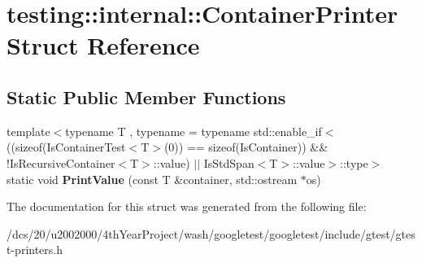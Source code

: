 \hypertarget{structtesting_1_1internal_1_1ContainerPrinter}{}\section{testing\+:\+:internal\+:\+:Container\+Printer Struct Reference}
\label{structtesting_1_1internal_1_1ContainerPrinter}
\subsection*{Static Public Member Functions}
\begin{DoxyCompactItemize}
\item 
\mbox{\label{structtesting_1_1internal_1_1ContainerPrinter_a1eabfa51051d78bf129afbd3ad99a2b0}} 
{\footnotesize template$<$typename T , typename  = typename std\+::enable\+\_\+if$<$                ((sizeof(\+Is\+Container\+Test$<$\+T$>$(0)) == sizeof(\+Is\+Container)) \&\&                 !\+Is\+Recursive\+Container$<$\+T$>$\+::value) $\vert$$\vert$                Is\+Std\+Span$<$\+T$>$\+::value$>$\+::type$>$ }\\static void {\bfseries Print\+Value} (const T \&container, std\+::ostream $\ast$os)
\end{DoxyCompactItemize}


The documentation for this struct was generated from the following file\+:\begin{DoxyCompactItemize}
\item 
/dcs/20/u2002000/4th\+Year\+Project/wash/googletest/googletest/include/gtest/gtest-\/printers.\+h\end{DoxyCompactItemize}
